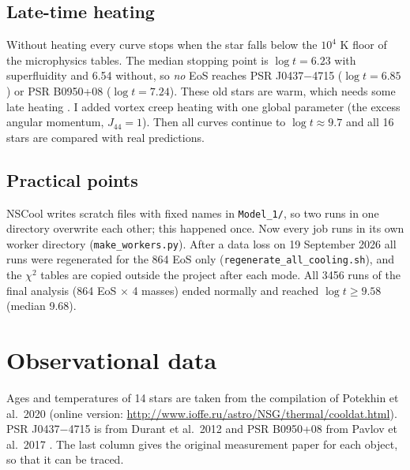 \documentclass[11pt,a4paper]{article}
\begin{document}
\subsection{Late-time heating}
Without heating every curve stops when the star falls below the $10^4$ K floor of the microphysics tables. The median stopping point is $\log t=6.23$ with superfluidity and 6.54 without, so \emph{no} EoS reaches PSR J0437$-$4715 ($\log t=6.85$) or PSR B0950+08 ($\log t=7.24$). These old stars are warm, which needs some late heating \cite{GonzalezReisenegger2010}. I added vortex creep heating \cite{Alpar1984,ShibazakiLamb1989} with one global parameter (the excess angular momentum, $J_{44}=1$). Then all curves continue to $\log t\approx9.7$ and all 16 stars are compared with real predictions.

\subsection{Practical points}
NSCool writes scratch files with fixed names in \texttt{Model\_1/}, so two runs in one directory overwrite each other; this happened once. Now every job runs in its own worker directory (\texttt{make\_workers.py}). After a data loss on 19 September 2026 all runs were regenerated for the 864 EoS only (\texttt{regenerate\_all\_cooling.sh}), and the $\chi^2$ tables are copied outside the project after each mode. All 3456 runs of the final analysis (864 EoS $\times$ 4 masses) ended normally and reached $\log t\ge9.58$ (median 9.68).

\section{Observational data}\label{sec:obs}
Ages and temperatures of 14 stars are taken from the compilation of Potekhin et al.\ 2020 \cite{Potekhin2020} (online version: \url{http://www.ioffe.ru/astro/NSG/thermal/cooldat.html}). PSR J0437$-$4715 is from Durant et al.\ 2012 \cite{Durant2012} and PSR B0950+08 from Pavlov et al.\ 2017 \cite{Pavlov2017}. The last column gives the original measurement paper for each object, so that it can be traced.
\end{document}
